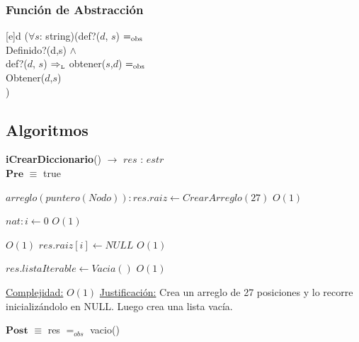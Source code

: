 
\pagebreak

\subsubsection{Funci\'on de Abstracci\'on}

[e]{d}{
($\forall s$: string)(def?($d$, $s$) $=_{\mathrm{obs}}$ \\ Definido?(d,s)
\- $\land$ \\
\- def?($d$, $s$) $\Rightarrow_{\mathrm{\scriptscriptstyle{L}}}$ obtener($s$,$d$) $=_{\mathrm{obs}}$ \\
\- Obtener($d$,$s$) \\
)
}

\subsection{Algoritmos}

\lstset{style=alg}


\begin{algorithm}[H]{\textbf{iCrearDiccionario}() $\to$ $res$ : $estr$}
	{\\ $\textbf{Pre}$ $\equiv$ true}
	\begin{algorithmic}

		\State $arreglo(puntero(Nodo)): res.raiz \gets CrearArreglo(27)$ \Comment $O(1)$
			 
		\State $nat: i \gets 0$ \Comment $O(1)$
			 
		 \Comment $O(1)$
		 	\State $res.raiz[i] \gets NULL$ \Comment $O(1)$
		\EndWhile

		\State $res.listaIterable \gets Vacia()$ \Comment $O(1)$

		\medskip
		\Statex \underline{Complejidad:} $O(1)$
		\Statex \underline{Justificación:} Crea un arreglo de 27 posiciones y lo recorre inicializándolo en NULL. Luego crea una lista vacía.

    \end{algorithmic}
    {$\textbf{Post}$ $\equiv$ res $=_{obs}$ vacio()}
\end{algorithm}


